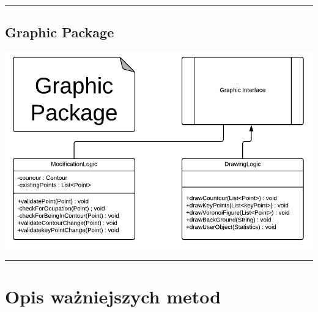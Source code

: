 \documentclass[a4paper,11pt]{article}
\newcommand{\linia}{\rule{\linewidth}{0.4mm}}
\begin{document}
\noindent\linia
\subsection{Graphic Package}
\includegraphics[scale=0.9]{graphicPackage.png} 

\noindent\linia
\section{Opis ważniejszych metod}
\end{document}
